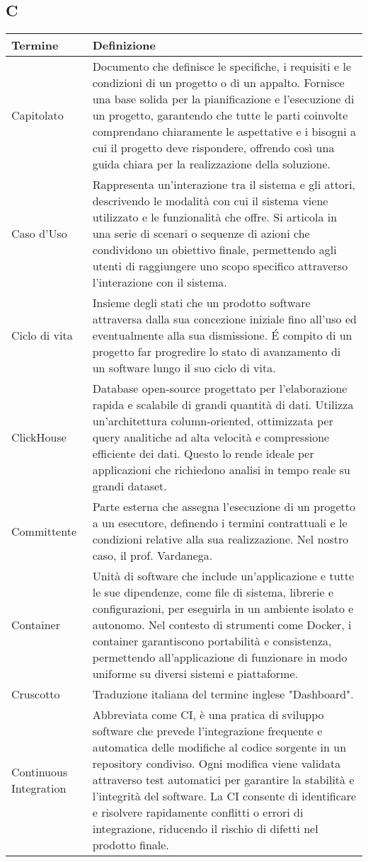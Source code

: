 \documentclass[10pt]{article}
\begin{document}
\subsection{C} %
\begin{longtable}{|>{\centering\arraybackslash}m{2.5cm}|>{\arraybackslash}m{12.5cm}|}
\hline
\rowcolor[gray]{0.8}
\textbf{Termine} & \textbf{Definizione}\\
\endhead
\hline
Capitolato & Documento che definisce le specifiche, i requisiti e le condizioni di un progetto o di un appalto. Fornisce una base solida per la pianificazione e l’esecuzione di un progetto, garantendo che tutte le parti coinvolte comprendano chiaramente le aspettative e i bisogni a cui il progetto deve rispondere, offrendo così una guida chiara per la realizzazione della soluzione.\\
\hline
Caso d'Uso & Rappresenta un'interazione tra il sistema e gli attori, descrivendo le modalità con cui il sistema viene utilizzato e le funzionalità che offre. Si articola in una serie di scenari o sequenze di azioni che condividono un obiettivo finale, permettendo agli utenti di raggiungere uno scopo specifico attraverso l'interazione con il sistema.\\
\hline
Ciclo di vita & Insieme degli stati che un prodotto software attraversa dalla sua concezione iniziale fino all'uso ed eventualmente alla sua dismissione. \'E compito di un progetto far progredire lo stato di avanzamento di un software lungo il suo ciclo di vita.\\
\hline
ClickHouse & Database open-source progettato per l'elaborazione rapida e scalabile di grandi quantità di dati. Utilizza un'architettura column-oriented, ottimizzata per query analitiche ad alta velocità e compressione efficiente dei dati. Questo lo rende ideale per applicazioni che richiedono analisi in tempo reale su grandi dataset.\\
\hline
Committente & Parte esterna che assegna l'esecuzione di un progetto a un esecutore, definendo i termini contrattuali e le condizioni relative alla sua realizzazione. Nel nostro caso, il prof. Vardanega.\\
\hline
Container & Unità di software che include un'applicazione e tutte le sue dipendenze, come file di sistema, librerie e configurazioni, per eseguirla in un ambiente isolato e autonomo. Nel contesto di strumenti come Docker, i container garantiscono portabilità e consistenza, permettendo all'applicazione di funzionare in modo uniforme su diversi sistemi e piattaforme.\\
\hline
Cruscotto & Traduzione italiana del termine inglese "Dashboard".\\
\hline
Continuous Integration & Abbreviata come CI, è una pratica di sviluppo software che prevede l'integrazione frequente e automatica delle modifiche al codice sorgente in un repository condiviso. Ogni modifica viene validata attraverso test automatici per garantire la stabilità e l'integrità del software. La CI consente di identificare e risolvere rapidamente conflitti o errori di integrazione, riducendo il rischio di difetti nel prodotto finale.\\
\hline
\end{longtable}
\end{document}

